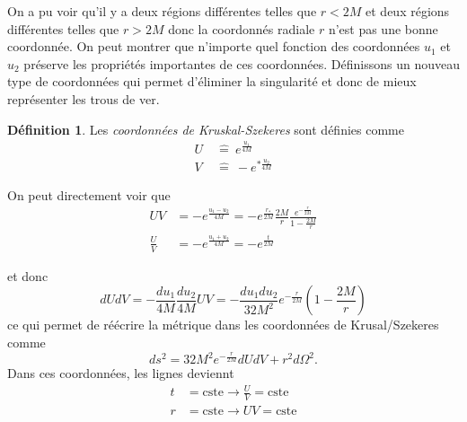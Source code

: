 \documentclass[a4paper,11pt]{report}
\theoremstyle{definition}
\theoremstyle{plain}
\theoremstyle{definition}
\newtheorem{defn}{Définition}[chapter]
\theoremstyle{remark}
\begin{document}
            On a pu voir qu'il y a deux régions différentes telles que $r<2M$ et deux régions différentes telles que $r>2M$ donc la coordonnés radiale $r$ n'est pas une bonne coordonnée. On peut montrer que n'importe quel fonction des coordonnées $u_1$ et $u_2$ préserve les propriétés importantes de ces coordonnées. Définissons un nouveau type de coordonnées qui permet d'éliminer la singularité et donc de mieux représenter les trous de ver.
            
            \begin{defn}
                Les \textit{coordonnées de Kruskal-Szekeres} sont définies comme
                \begin{align}
                    U ~&\hat{=}~ e^{\frac{u_1}{4M}}\\
                    V ~&\hat{=}~ -e^{*\frac{u_2}{4M}}
                \end{align}
            \end{defn}
            
            On peut directement voir que 
            \begin{align}
                UV &= -e^{\frac{u_1-u_2}{4M}} = -e^{\frac{r_*}{2M}}\frac{2M}{r}\frac{e^{-\frac{r}{2M}}}{1-\frac{2M}{r}}\\
                \frac{U}{V} &= -e^{\frac{u_1+u_2}{4M}} = -e^{\frac{t}{2M}}
            \end{align}
            
            et donc
            \begin{equation}
                dUdV = -\frac{du_1}{4M}\frac{du_2}{4M}UV = -\frac{du_1du_2}{32M^2}e^{-\frac{r}{2M}}\left( 1-\frac{2M}{r} \right)
            \end{equation}
            ce qui permet de réécrire la métrique dans les coordonnées de Krusal/Szekeres comme
            \begin{equation}
                ds^2 = 32M^2e^{-\frac{r}{2M}}dUdV+r^2d\Omega^2.
            \end{equation}
            Dans ces coordonnées, les lignes deviennt
            \begin{align}
                t &= \text{cste} \to \frac{U}{V} = \text{cste}\\
                r &= \text{cste} \to UV = \text{cste}
            \end{align}
            
            
            
\end{document}
